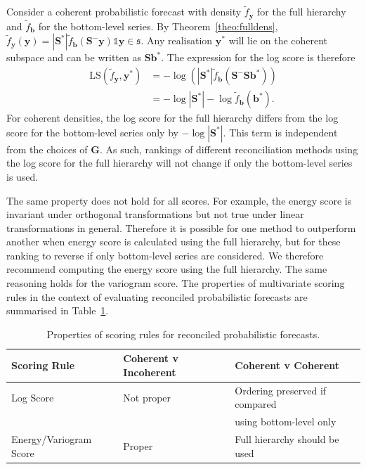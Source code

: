 \documentclass[12pt]{article}
\theoremstyle{definition}
\begin{document}
Consider a coherent probabilistic forecast with density $\tilde{f}_{\bm{y}}$ for the full hierarchy and $\tilde{f}_{\bm{b}}$ for the bottom-level series. By Theorem~\ref{theo:fulldens}, $\tilde{f}_{\bm{y}}(\bm{y})=|\bm{S}^*|\tilde{f}_{\bm{b}}(\bm{S}^-\bm{y})\mathbb{1}{\bm{y}\in\mathfrak{s}}$.  Any realisation $\bm{y}^*$ will lie on the coherent subspace and can be written as $\bm{S}\bm{b}^*$.  The expression for the log score is therefore
\begin{align}
\text{LS}(\tilde{f}_{\bm y},\bm{y}^*)&=-\log\left(|\bm{S}^*|\tilde{f}_{\bm{b}}(\bm{S}^-\bm{S}\bm{b}^*)\right)\nonumber\\
&=-\log|\bm{S}^*|-\log \tilde{f}_{\bm{b}}(\bm{b}^*).\nonumber
\end{align}
For coherent densities, the log score for the full hierarchy differs from the log score for the bottom-level series only by $-\log|\bm{S}^*|$. This term is independent from the choices of ${\bm G}$. As such, rankings of different reconciliation methods using the log score for the full hierarchy will not change if only the bottom-level series is used.

The same property does not hold for all scores. For example, the energy score is invariant under orthogonal transformations \citep{Szekely2013,Gneiting2007} but not true under linear transformations in general. Therefore it is possible for one method to outperform another when energy score is calculated using the full hierarchy, but for these ranking to reverse if only bottom-level series are considered.  We therefore recommend computing the energy score using the full hierarchy.  The same reasoning holds for the variogram score.  The properties of multivariate scoring rules in the context of evaluating reconciled probabilistic forecasts are summarised in Table~\ref{tab:prop}.

\begin{table}
	\caption{Properties of scoring rules for reconciled probabilistic forecasts.}\label{tab:ScoringRulesProperties}
	\centering
	\begin{tabular}{lll}\hline
		Scoring Rule& Coherent v Incoherent &Coherent v Coherent\\
		\hline
		Log Score & Not proper & Ordering preserved if compared \\ && using bottom-level only\\
		Energy/Variogram Score & Proper & Full hierarchy should be used\\
		\hline
	\end{tabular}
	
	\label{tab:prop}
\end{table}
\end{document}

